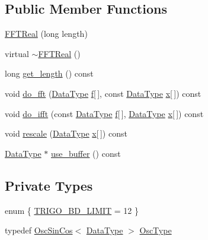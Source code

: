 \subsection*{Public Member Functions}
\begin{DoxyCompactItemize}
\item 
\hyperlink{classffft_1_1FFTReal_a627db4d781235302c3a229fc4d7a10ba}{F\+F\+T\+Real} (long length)
\item 
virtual \hyperlink{classffft_1_1FFTReal_a04f14f3576aac18af45ba22c38fbaf2a}{$\sim$\+F\+F\+T\+Real} ()
\item 
long \hyperlink{classffft_1_1FFTReal_abdd5b144ba5737c7ad27095d1658c29e}{get\+\_\+length} () const 
\item 
void \hyperlink{classffft_1_1FFTReal_a4c5b863a285c5a87f38517735cbf1352}{do\+\_\+fft} (\hyperlink{classffft_1_1FFTReal_a606148f1cf8c3b7d705473932fc063d1}{Data\+Type} \hyperlink{FFTReal__readme_8txt_abbf3cc73d1e3e4714ab1639819396eca}{f}\mbox{[}$\,$\mbox{]}, const \hyperlink{classffft_1_1FFTReal_a606148f1cf8c3b7d705473932fc063d1}{Data\+Type} \hyperlink{FFTReal__readme_8txt_a9c92ac89d1560f812393ca39a19e581e}{x}\mbox{[}$\,$\mbox{]}) const 
\item 
void \hyperlink{classffft_1_1FFTReal_a8ab2e0da482cea88a61f01d58c074989}{do\+\_\+ifft} (const \hyperlink{classffft_1_1FFTReal_a606148f1cf8c3b7d705473932fc063d1}{Data\+Type} \hyperlink{FFTReal__readme_8txt_abbf3cc73d1e3e4714ab1639819396eca}{f}\mbox{[}$\,$\mbox{]}, \hyperlink{classffft_1_1FFTReal_a606148f1cf8c3b7d705473932fc063d1}{Data\+Type} \hyperlink{FFTReal__readme_8txt_a9c92ac89d1560f812393ca39a19e581e}{x}\mbox{[}$\,$\mbox{]}) const 
\item 
void \hyperlink{classffft_1_1FFTReal_a9e30fff775905b1059aa9299004ee228}{rescale} (\hyperlink{classffft_1_1FFTReal_a606148f1cf8c3b7d705473932fc063d1}{Data\+Type} \hyperlink{FFTReal__readme_8txt_a9c92ac89d1560f812393ca39a19e581e}{x}\mbox{[}$\,$\mbox{]}) const 
\item 
\hyperlink{classffft_1_1FFTReal_a606148f1cf8c3b7d705473932fc063d1}{Data\+Type} $\ast$ \hyperlink{classffft_1_1FFTReal_af1fcd007f1cf0b41bd2188e0b3cd5cca}{use\+\_\+buffer} () const 
\end{DoxyCompactItemize}
\subsection*{Private Types}
\begin{DoxyCompactItemize}
\item 
enum \{ \hyperlink{classffft_1_1FFTReal_a69a4ed5b7507683f5233ddbd34f0e1eea5b9b73ce99dfec1ae2f92dd0151fa07e}{T\+R\+I\+G\+O\+\_\+\+B\+D\+\_\+\+L\+I\+M\+IT} = 12
 \}
\item 
typedef \hyperlink{classffft_1_1OscSinCos}{Osc\+Sin\+Cos}$<$ \hyperlink{classffft_1_1FFTReal_a606148f1cf8c3b7d705473932fc063d1}{Data\+Type} $>$ \hyperlink{classffft_1_1FFTReal_a3b9f6dae05435b3696c6c84155e0953a}{Osc\+Type}
\end{DoxyCompactItemize}
